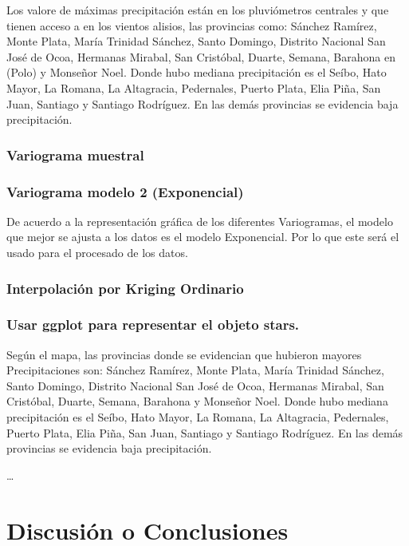 \documentclass[11pt,]{article}
\begin{document}
Los valore de máximas precipitación están en los pluviómetros centrales
y que tienen acceso a en los vientos alisios, las provincias como:
Sánchez Ramírez, Monte Plata, María Trinidad Sánchez, Santo Domingo,
Distrito Nacional San José de Ocoa, Hermanas Mirabal, San Cristóbal,
Duarte, Semana, Barahona en (Polo) y Monseñor Noel. Donde hubo mediana
precipitación es el Seíbo, Hato Mayor, La Romana, La Altagracia,
Pedernales, Puerto Plata, Elia Piña, San Juan, Santiago y Santiago
Rodríguez. En las demás provincias se evidencia baja precipitación.

\subsubsection{Variograma muestral}\label{variograma-muestral}

\subsubsection{Variograma modelo 2
(Exponencial)}\label{variograma-modelo-2-exponencial}

De acuerdo a la representación gráfica de los diferentes Variogramas, el
modelo que mejor se ajusta a los datos es el modelo Exponencial. Por lo
que este será el usado para el procesado de los datos.

\subsubsection{Interpolación por Kriging
Ordinario}\label{interpolaciuxf3n-por-kriging-ordinario}

\subsubsection{Usar ggplot para representar el objeto
stars.}\label{usar-ggplot-para-representar-el-objeto-stars.}

Según el mapa, las provincias donde se evidencian que hubieron mayores
Precipitaciones son: Sánchez Ramírez, Monte Plata, María Trinidad
Sánchez, Santo Domingo, Distrito Nacional San José de Ocoa, Hermanas
Mirabal, San Cristóbal, Duarte, Semana, Barahona y Monseñor Noel. Donde
hubo mediana precipitación es el Seíbo, Hato Mayor, La Romana, La
Altagracia, Pedernales, Puerto Plata, Elia Piña, San Juan, Santiago y
Santiago Rodríguez. En las demás provincias se evidencia baja
precipitación.

\ldots

\section{Discusión o Conclusiones}\label{discusiuxf3n-o-conclusiones}
\end{document}
